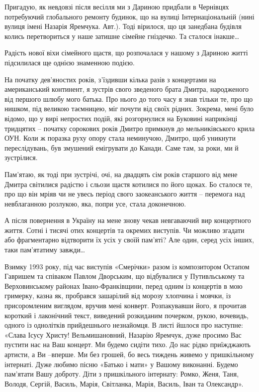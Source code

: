 Пригадую, як невдовзі після весілля ми з Дариною придбали в Чернівцях
потребуючий глобального ремонту будинок, що на вулиці Інтернаціональній (нині
вулиця імені Назарія Яремчука. Авт.). Тоді вірилося, що ця занедбана будівля
колись перетвориться у наше затишне сімейне гніздечко. Та сталося інакше…

Радість нової віхи сімейного щастя, що розпочалася у нашому з Дариною житті
підсилилася ще однією знаменною подією. 

На початку дев’яностих років, з’їздивши кілька разів з концертами на
американський континент, я зустрів свого зведеного брата Дмитра, народженого
від першого шлюбу мого батька. Про нього до того часу я знав тільки те, про що
нишком, під великою таємницею, міг почути від своїх рідних. Зокрема, мені було
відомо, що у вирі непростих подій, які розгорнулися на Буковині наприкінці
тридцятих – початку сорокових років Дмитро примкнув до мельниківського крила
ОУН. Коли ж поразка руху опору стала неминучою, Дмитро, щоб уникнути
переслідувань, був змушений емігрувати до Канади. Саме там, за роки, ми й
зустрілися. 

Пам’ятаю, як тоді при зустрічі, очі, на двадцять сім років старшого від мене
Дмитра світилися радістю і сльози щастя котилися по його щоках. Бо сталося те,
про що він мріяв чи не увесь період свого заокеанського життя –  перемога над
невблаганною розлукою, яка, попри усе, стала доконечною.  

А після повернення в Україну на  мене знову чекав невгаваючий вир концертного
життя. Сотні і тисячі отих концертів та окремих виступів. Чи можливо згадати
або фрагментарно відтворити їх усіх у своїй пам’яті? Але один, серед усіх
інших, таки пам’ятатиму завжди…

Взимку 1993 року, під час виступів «Смерічки» разом із композитором Остапом
Гавришем та співаком Павлом Дворським, що відбувалися у Путивльському та
Верховинському районах Івано-Франківщини, перед одним із концертів в мою
гримерку, казна як, пробрався зашарілий від морозу хлопчина і мовчки, із
присоромленим виглядом, вручив мені конверт. Розпакувавши його, я прочитав
короткий і лаконічний текст, виведений розкиданим почерком, рукою, вочевидь,
одного із однолітків прийдешнього незнайомця. В листі йшлося про наступне:
«Слава Ісусу Христу! Вельмишановний, Назарію Яремчук, дуже просимо Вас пустити
нас на Ваш концерт. Ми будемо сидіти тихо. До нас рідко приїжджають артисти, а
Ви  –вперше. Ми без грошей, бо весь тиждень живемо у пришкільному інтернаті.
Дуже любимо пісню «Батько і мати» у Вашому виконанні. Будемо пам'ятати Вашу
доброту. Діти з пришкільного інтернату: Ромко, Женя, Таня, Володя, Сергій,
Василь, Марія, Світланка, Марія, Василь, Іван та Олександр».

